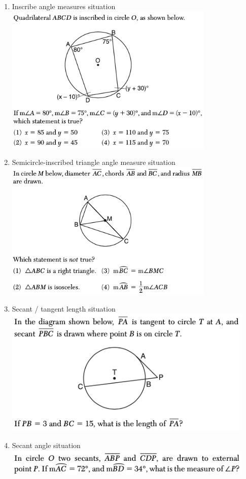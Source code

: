 \documentclass[12pt, oneside]{article}
\begin{document}
\begin{enumerate}
\newpage
\item Inscribe angle measures situation\\
\includegraphics[width=10cm]{R-2images/R-2chordsJ.png}
\vspace{1cm}

\item Semicircle-inscribed triangle angle measure situation\\
\includegraphics[width=10cm]{R-2images/R-2chordsK.png}
\vspace{1cm}

\newpage
\item Secant / tangent length situation\\
\includegraphics[width=12cm]{R-2images/R-2secantsA.png}
\vspace{2cm}

\item Secant angle situation\\
\includegraphics[width=12cm]{R-2images/R-2secantsB.png}
\vspace{1cm}

\end{enumerate}
\end{document}
